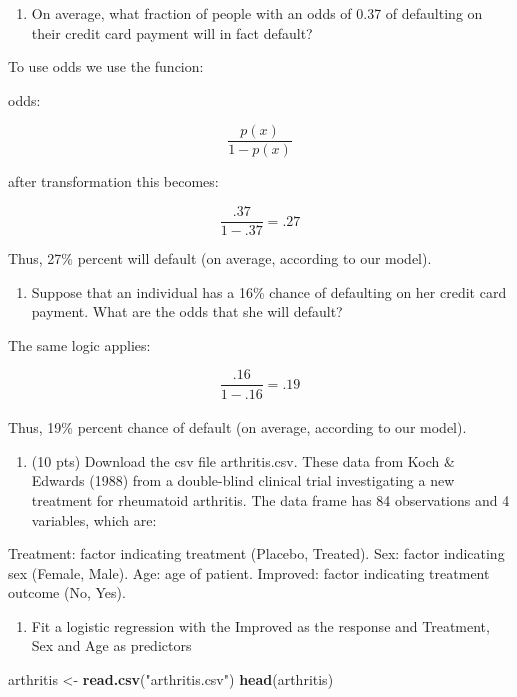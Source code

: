 \documentclass[]{article}
\newenvironment{Shaded}{\begin{snugshade}}{\end{snugshade}}
\newcommand{\KeywordTok}[1]{\textcolor[rgb]{0.13,0.29,0.53}{\textbf{#1}}}
\newcommand{\StringTok}[1]{\textcolor[rgb]{0.31,0.60,0.02}{#1}}
\newcommand{\NormalTok}[1]{#1}
\providecommand{\tightlist}{%
  \setlength{\itemsep}{0pt}\setlength{\parskip}{0pt}}
\begin{document}
\begin{enumerate}
\def\labelenumi{(\alph{enumi})}
\tightlist
\item
  On average, what fraction of people with an odds of 0.37 of defaulting
  on their credit card payment will in fact default?
\end{enumerate}

To use odds we use the funcion:

odds:

\[ \frac{p(x)}{1-p(x)} \]

after transformation this becomes:

\[ \frac{.37}{1-.37} = .27 \]

Thus, 27\% percent will default (on average, according to our model).

\begin{enumerate}
\def\labelenumi{(\alph{enumi})}
\setcounter{enumi}{1}
\tightlist
\item
  Suppose that an individual has a 16\% chance of defaulting on her
  credit card payment. What are the odds that she will default?
\end{enumerate}

The same logic applies:

\[ \frac{.16}{1-.16} = .19 \]\\
Thus, 19\% percent chance of default (on average, according to our
model).

\begin{enumerate}
\def\labelenumi{\arabic{enumi}.}
\setcounter{enumi}{6}
\tightlist
\item
  (10 pts) Download the csv file arthritis.csv. These data from Koch \&
  Edwards (1988) from a double-blind clinical trial investigating a new
  treatment for rheumatoid arthritis. The data frame has 84 observations
  and 4 variables, which are:
\end{enumerate}

Treatment: factor indicating treatment (Placebo, Treated). Sex: factor
indicating sex (Female, Male). Age: age of patient. Improved: factor
indicating treatment outcome (No, Yes).

\begin{enumerate}
\def\labelenumi{(\alph{enumi})}
\tightlist
\item
  Fit a logistic regression with the Improved as the response and
  Treatment, Sex and Age as predictors
\end{enumerate}

\begin{Shaded}
\begin{Highlighting}[]
\NormalTok{arthritis <-}\StringTok{ }\KeywordTok{read.csv}\NormalTok{(}\StringTok{"arthritis.csv"}\NormalTok{)}
\KeywordTok{head}\NormalTok{(arthritis)}
\end{Highlighting}
\end{Shaded}
\end{document}
